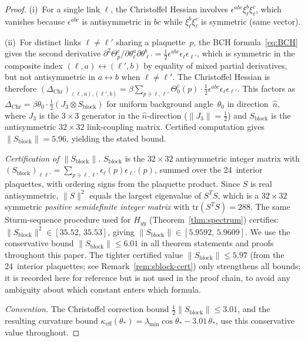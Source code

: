 \documentclass[11pt]{article}
\theoremstyle{definition}
\newcommand{\tr}{\mathrm{tr}}
\begin{document}
\begin{proof}
(i)~For a single link $\ell$, the Christoffel Hessian involves
$\epsilon^{abc}\xi_\ell^b\xi_\ell^c$, which vanishes because
$\epsilon^{abc}$ is antisymmetric in $bc$ while
$\xi_\ell^b\xi_\ell^c$ is symmetric (same vector).

(ii)~For distinct links $\ell\ne\ell'$ sharing a plaquette~$p$,
the BCH formula~\eqref{eq:BCH} gives the second derivative
$\partial^2\Theta_p^c/\partial\theta_\ell^a\partial\theta_{\ell'}^b
=\tfrac{1}{2}\epsilon^{abc}\epsilon_\ell\epsilon_{\ell'}$,
which is symmetric in the composite index $(\ell,a)\leftrightarrow(\ell',b)$
by equality of mixed partial derivatives, but not antisymmetric
in $a\leftrightarrow b$ when $\ell\ne\ell'$.
The Christoffel Hessian is therefore
$(\Delta_{\mathrm{Chr}})_{(\ell,a),(\ell',b)}
=\beta\sum_{p\ni\ell,\ell'}\Theta_0^c(p)\cdot
\tfrac{1}{2}\epsilon^{abc}\epsilon_\ell\epsilon_{\ell'}$.
This factors as $\Delta_{\mathrm{Chr}}
=\beta\theta_0\cdot\tfrac{1}{2}(J_3\otimes S_{\mathrm{block}})$
for uniform background angle~$\theta_0$ in direction~$\hat{n}$,
where $J_3$ is the $3\times 3$ generator in the $\hat{n}$-direction
($\|J_3\|=\tfrac{1}{2}$) and $S_{\mathrm{block}}$ is the
antisymmetric $32\times 32$ link-coupling matrix.
Certified computation gives $\|S_{\mathrm{block}}\|=5.96$,
yielding the stated bound.

\emph{Certification of $\|S_{\mathrm{block}}\|$.}
$S_{\mathrm{block}}$ is the $32\times 32$ antisymmetric integer
matrix with $(S_{\mathrm{block}})_{\ell\ell'}
=\sum_{p\ni\ell,\ell'}\epsilon_\ell(p)\epsilon_{\ell'}(p)$,
summed over the 24~interior plaquettes, with ordering signs
from the plaquette product.
Since $S$ is real antisymmetric, $\|S\|^2$ equals the largest
eigenvalue of $S^TS$, which is a $32\times 32$ symmetric
\emph{positive semidefinite integer matrix} with
$\tr(S^TS)=288$.
The same Sturm-sequence procedure used for $H_{yy}$
(Theorem~\ref{thm:spectrum}) certifies:
$\|S_{\mathrm{block}}\|^2\in[35.52,\,35.53]$, giving
$\|S_{\mathrm{block}}\|\in[5.9592,\,5.9609]$.
We use the conservative bound $\|S_{\mathrm{block}}\|\le 6.01$
in all theorem statements and proofs throughout this paper.
The tighter certified value $\|S_{\mathrm{block}}\|\le 5.97$
(from the 24~interior plaquettes; see Remark~\ref{rem:sblock-cert})
only strengthens all bounds; it is recorded here for reference
but is not used in the proof chain, to avoid any
ambiguity about which constant enters which formula.

\emph{Convention.} The Christoffel correction bound
$\frac{1}{2}\|S_{\mathrm{block}}\|\le 3.01$, and the resulting
curvature bound $\kappa_{\mathrm{eff}}(\theta_*)
=\lambda_{\min}\cos\theta_*-3.01\,\theta_*$,
use this conservative value throughout.
\end{proof}
\end{document}
